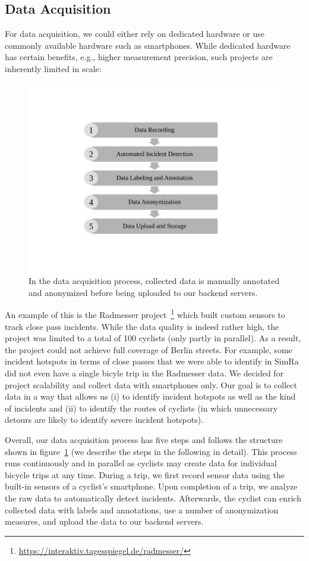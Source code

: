 \subsection{Data Acquisition}
\label{subsec:data_acquisition}
For data acquisition, we could either rely on dedicated hardware or use commonly available hardware such as smartphones.
While dedicated hardware has certain benefits, e.g., higher measurement precision, such projects are inherently limited in scale:
\begin{figure}
    \center
    \includegraphics[width=0.5\columnwidth]{fig/data_acquisition_process.pdf}
    \caption{In the data acquisition process, collected data is manually annotated and anonymized before being uploaded to our backend servers.}
    \label{fig:data_acquisition_process}
\end{figure}
An example of this is the Radmesser project~\footnote{\url{https://interaktiv.tagesspiegel.de/radmesser/}} which built custom sensors to track close pass incidents.
While the data quality is indeed rather high, the project was limited to a total of 100 cyclists (only partly in parallel).
As a result, the project could not achieve full coverage of Berlin streets.
For example, some incident hotspots in terms of close passes that we were able to identify in SimRa did not even have a single bicyle trip in the Radmesser data.
We decided for project scalability and collect data with smartphones only.
Our goal is to collect data in a way that allows us (i) to identify incident hotspots as well as the kind of incidents and (ii) to identify the routes of cyclists (in which unnecessary detours are likely to identify severe incident hotspots).


Overall, our data acquisition process has five steps and follows the structure shown in figure~\ref{fig:data_acquisition_process} (we describe the steps in the following in detail).
This process runs continuously and in parallel as cyclists may create data for individual bicycle trips at any time.
During a trip, we first record sensor data using the built-in sensors of a cyclist's smartphone.
Upon completion of a trip, we analyze the raw data to automatically detect incidents.
Afterwards, the cyclist can enrich collected data with labels and annotations, use a number of anonymization measures, and upload the data to our backend servers.


